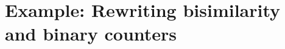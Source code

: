 


\section{Example: Rewriting bisimilarity and binary counters}\label{sec:ordered-bisimilarity:counter}

